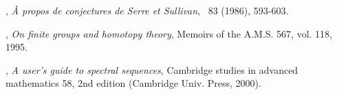 \begin{thebibliography}{99}






, \textit{\`A propos de conjectures de Serre et Sullivan}, \INVEM\ 83 (1986), 593-603.


, \textit{On finite groups and homotopy theory}, Memoirs of the A.M.S. 567, vol. 118, 1995.


, \textit{A user's guide to spectral sequences}, Cambridge studies in advanced mathematics 58, 2nd edition (Cambridge Univ. Press, 2000).






\end{thebibliography}
